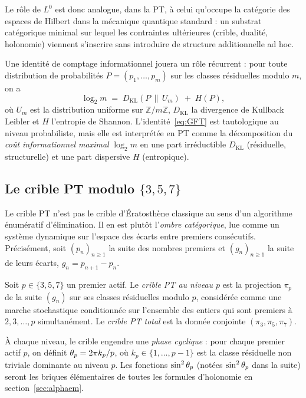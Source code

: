 Le rôle de $L^0$ est donc analogue, dans la PT, à celui qu'occupe la catégorie des espaces de Hilbert dans la mécanique quantique standard : un substrat catégorique minimal sur lequel les contraintes ultérieures (crible, dualité, holonomie) viennent s'inscrire sans introduire de structure additionnelle ad hoc.

Une identité de comptage informationnel jouera un rôle récurrent : pour toute distribution de probabilités $P = (p_1, \dots, p_m)$ sur les classes résiduelles modulo $m$, on a
\begin{equation}
\log_2 m \;=\; D_{\mathrm{KL}}\!\left(P \,\|\, U_m\right) \;+\; H(P),
\label{eq:GFT}
\end{equation}
où $U_m$ est la distribution uniforme sur $\mathbb{Z}/m\mathbb{Z}$, $D_{\mathrm{KL}}$ la divergence de Kullback\,\textendash\,Leibler et $H$ l'entropie de Shannon. L'identité~\eqref{eq:GFT} est tautologique au niveau probabiliste, mais elle est interprétée en PT comme la décomposition du \emph{coût informationnel maximal} $\log_2 m$ en une part irréductible $D_{\mathrm{KL}}$ (résiduelle, structurelle) et une part dispersive $H$ (entropique).

\subsection{Le crible PT modulo \texorpdfstring{$\{3, 5, 7\}$}{{3,5,7}}}
\label{sec:cadre:crible}

Le crible PT n'est pas le crible d'Ératosthène classique au sens d'un algorithme énumératif d'élimination. Il en est plutôt l'\emph{ombre catégorique}, lue comme un système dynamique sur l'espace des écarts entre premiers consécutifs. Précisément, soit $(p_n)_{n \geq 1}$ la suite des nombres premiers et $(g_n)_{n \geq 1}$ la suite de leurs écarts, $g_n = p_{n+1} - p_n$.

\begin{definition}
\label{def:crible}
Soit $p \in \{3, 5, 7\}$ un premier actif. Le \emph{crible PT au niveau $p$} est la projection $\pi_p$ de la suite $(g_n)$ sur ses classes résiduelles modulo $p$, considérée comme une marche stochastique conditionnée sur l'ensemble des entiers qui sont premiers à $2, 3, \dots, p$ simultanément. Le \emph{crible PT total} est la donnée conjointe $(\pi_3, \pi_5, \pi_7)$.
\end{definition}

À chaque niveau, le crible engendre une \emph{phase cyclique} : pour chaque premier actif $p$, on définit $\theta_{p} = 2\pi k_p / p$, où $k_p \in \{1, \dots, p-1\}$ est la classe résiduelle non triviale dominante au niveau $p$. Les fonctions $\sin^2 \theta_{p}$ (notées $\sin^{2}\theta_{p}$ dans la suite) seront les briques élémentaires de toutes les formules d'holonomie en section~\ref{sec:alphaem}.

